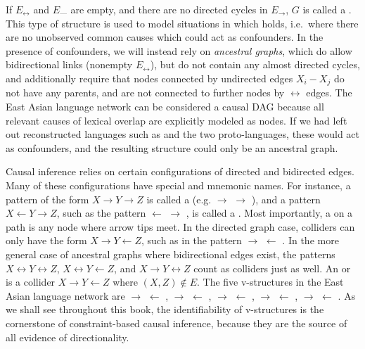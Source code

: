 If $E_\leftrightarrow$ and $E_\text{---}$ are empty, and there are no directed cycles in $E_\rightarrow$, $G$ is called a \textit{}. This type of structure is used to model situations in which  holds, i.e.\ where there are no unobserved common causes which could act as confounders. In the presence of confounders, we will instead rely on \textit{ancestral graphs}, which do allow bidirectional links (nonempty $E_\leftrightarrow$), but do not contain any almost directed cycles, and additionally require that nodes connected by undirected edges $X_i - X_j$ do not have any parents, and are not connected to further nodes by $\leftrightarrow$ edges. The East Asian language network can be considered a causal DAG because all relevant causes of lexical overlap are explicitly modeled as nodes. If we had left out reconstructed languages such as  and the two proto-languages, these would act as confounders, and the resulting structure could only be 
an ancestral graph.

\largerpage
Causal inference relies on certain configurations of directed and bidirected edges. Many of these configurations have special and mnemonic names. For instance, a pattern of the form $X \rightarrow Y \rightarrow Z$ is called a \textit{} (e.g.  $\rightarrow$  $\rightarrow$ ), and a pattern $X \leftarrow Y \rightarrow Z$, such as the pattern  $\leftarrow$  $\rightarrow$ , is called a \textit{}.
Most importantly, a \textit{} on a path is any node where arrow tips meet. In the directed graph case, colliders can only have the form $X \rightarrow Y \leftarrow Z$, such as in the pattern  $\rightarrow$  $\leftarrow$ . In the more general case of ancestral graphs where bidirectional edges exist, the patterns $X \leftrightarrow Y \leftrightarrow Z$, $X \leftrightarrow Y \leftarrow Z$, and $X \rightarrow Y \leftrightarrow Z$ count as colliders just as well. An  or \textit{} is a collider $X \rightarrow Y \leftarrow Z$ where $(X,Z) \notin E$. The five v-structures in the East Asian language network are  $\rightarrow$  $\leftarrow$ ,  $\rightarrow$  $\leftarrow$ ,  $\rightarrow$  $\leftarrow$ ,  $\rightarrow$  $\leftarrow$ ,  $\rightarrow$  $\leftarrow$ . As we shall see throughout this book, the identifiability of v-structures is the cornerstone of constraint-based causal inference, because they are the source of all evidence of directionality.

